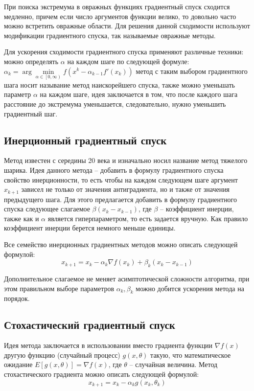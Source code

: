 При поиска экстремума в овражных функциях градиентный спуск сходится медленно, причем если число аргументов функции велико, то довольно часто можно встретить овражные области. Для решения данной сходимости используют модификации градиентного спуска, так называемые овражные методы.

Для ускорения сходимости градиентного спуска применяют различные техники: можно определять $\alpha$ на каждом шаге по следующей формуле: $\alpha_{k} = \arg \min\limits_{\alpha \in \left[  0, \infty \right) } f(x^k - \alpha_{k-1} f'(x_k))$ метод с таким выбором градиентного шага носит называние метод наискорейшего спуска, также можно уменьшать параметр $\alpha$ на каждом шаге, идея заключается в том, что после каждого шага расстояние до экстремума уменьшается, следовательно, нужно уменьшить градиентный шаг.


\subsection{Инерционный градиентный спуск}

Метод известен с середины 20 века и изначально носил название метод тяжелого шарика. Идея данного метода -- добавить в формулу градиентного спуска свойство инерционности, то есть чтобы на каждом следующем шаге аргумент $x_{k+1}$ зависел не только от значения антиградиента, но и также от значения предыдущего шага. Для этого предлагается добавить в формулу градиентного спуска следующее слагаемое $\beta (x_k - x_{k-1})$, где $\beta$ -- коэффициент инерции, также как и $\alpha$ является гиперпараметром, то есть задается вручную. Как правило коэффициент инерции берется немного меньше единицы.

Все семейство инерционных градиентных методов можно описать следующей формулой:
$$ x_{k+1} = x_k - \alpha_k \nabla f(x_k) + \beta_k (x_k - x_{k-1}) $$

Дополнительное слагаемое не меняет асимптотической сложности алгоритма, при этом правильном выборе параметров $\alpha_k, \beta_k$ можно добится ускорения метода на порядок.


\subsection{Стохастический градиентный спуск}

Идея метода заключается в использовании вместо градиента функции $\nabla f(x)$ другую функцию (случайный процесс) $g(x,\theta)$ такую, что математическое ожидание $E[g(x,\theta)] = \nabla f(x)$, где $\theta$ -- случайная величина.
Метод стохастического градиента можно описать следующей формулой:
$$ x_{k+1} = x_k - \alpha_k g(x_k,\theta_k) $$

